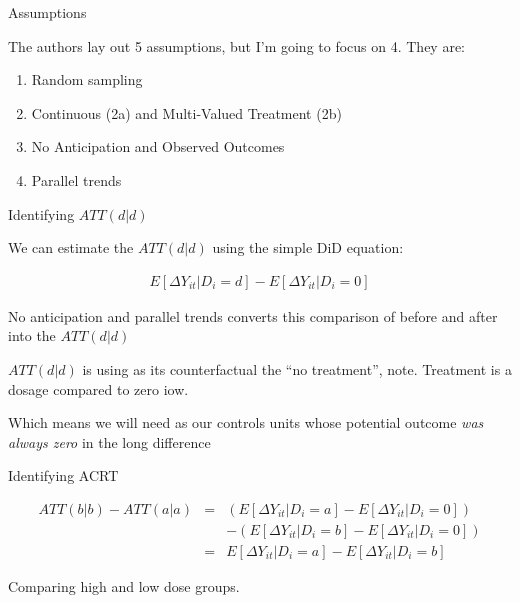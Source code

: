 \documentclass{beamer}
\begin{document}
\begin{frame}{Assumptions}

The authors lay out 5 assumptions, but I’m going to focus on 4. They are:

\begin{enumerate}
\item Random sampling
\item Continuous (2a) and Multi-Valued Treatment (2b)
\item No Anticipation and Observed Outcomes
\item Parallel trends
\end{enumerate}

\end{frame}

\begin{frame}{Identifying $ATT(d|d)$}

We can estimate the $ATT(d|d)$ using the simple DiD equation:

\begin{eqnarray*}
E [ \Delta Y_{it} | D_i = d] - E[ \Delta Y_{it} | D_i = 0]
\end{eqnarray*}

\bigskip

No anticipation and parallel trends converts this comparison of before and after into the $ATT(d|d)$

\bigskip

$ATT(d|d)$ is using as its counterfactual the ``no treatment'', note.  Treatment is a dosage compared to zero iow.

\bigskip

Which means we will need as our controls units whose potential outcome \emph{was always zero} in the long difference

\end{frame}


\begin{frame}{Identifying ACRT}


\begin{eqnarray*}
ATT(b|b) - ATT(a|a) &=& ( E[ \Delta Y_{it} | D_i =a ] - E[ \Delta Y_{it} | D_i = 0]) \\
&& - ( E[ \Delta Y_{it} | D_i =b ] - E[ \Delta Y_{it} | D_i = 0]) \\
&=& E [ \Delta Y_{it} | D_i=a] - E[\Delta Y_{it} | D_i=b]
\end{eqnarray*}

Comparing high and low dose groups.

\end{frame}
\end{document}
